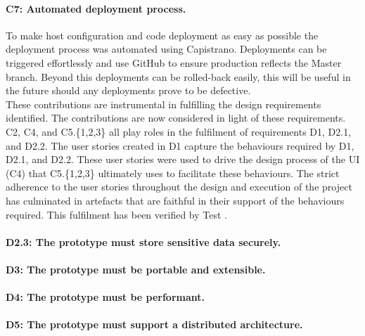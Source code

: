 \paragraph{C7: Automated deployment process.}
 
To make host configuration and code deployment as easy as possible the deployment process was automated using Capistrano. Deployments can be triggered effortlessly and use GitHub to ensure production reflects the Master branch. Beyond this deployments can be rolled-back easily, this will be useful in the future should any deployments prove to be defective.
\\
\newline
These contributions are instrumental in fulfilling the design requirements identified. The contributions are now considered in light of these requirements.
\\
\newline
C2, C4, and C5.\{1,2,3\} all play roles in the fulfilment of requirements D1, D2.1, and D2.2. The user stories created in D1 capture the behaviours required by D1, D2.1, and D2.2. These user stories were used to drive the design process of the UI (C4) that C5.\{1,2,3\} ultimately uses to facilitate these behaviours. The strict adherence to the user stories throughout the design and execution of the project has culminated in artefacts that are faithful in their support of the behaviours required. This fulfilment has been verified by Test .

\paragraph{D2.3: The prototype must store sensitive data securely.}

\paragraph{D3:  The prototype must be portable and extensible.}

\paragraph{D4: The prototype must be performant.}

\paragraph{D5: The prototype must support a distributed architecture.}




